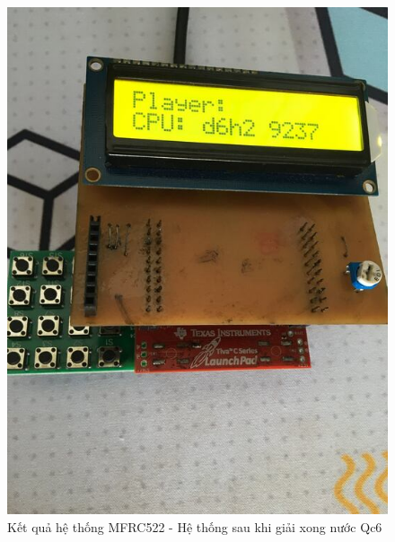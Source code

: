 \begin{figure}[ht]
\centering
\includegraphics[scale=0.4]{images/chess_wait_move2.jpg}
\caption{Kết quả hệ thống MFRC522 - Hệ thống sau khi giải xong nước Qc6}
\label{fig:chess_wait_move2}
\end{figure}

